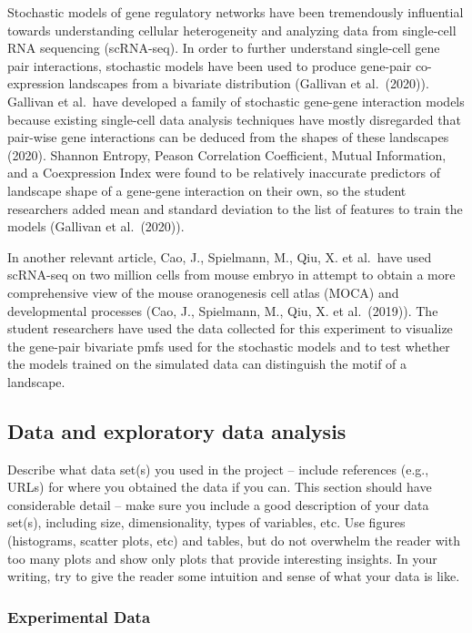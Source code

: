 \documentclass[
]{article}
\begin{document}
Stochastic models of gene regulatory networks have been tremendously
influential towards understanding cellular heterogeneity and analyzing
data from single-cell RNA sequencing (scRNA-seq). In order to further
understand single-cell gene pair interactions, stochastic models have
been used to produce gene-pair co-expression landscapes from a bivariate
distribution (Gallivan et al.~(2020)). Gallivan et al.~have developed a
family of stochastic gene-gene interaction models because existing
single-cell data analysis techniques have mostly disregarded that
pair-wise gene interactions can be deduced from the shapes of these
landscapes (2020). Shannon Entropy, Peason Correlation Coefficient,
Mutual Information, and a Coexpression Index were found to be relatively
inaccurate predictors of landscape shape of a gene-gene interaction on
their own, so the student researchers added mean and standard deviation
to the list of features to train the models (Gallivan et al.~(2020)).

In another relevant article, Cao, J., Spielmann, M., Qiu, X. et al.~have
used scRNA-seq on two million cells from mouse embryo in attempt to
obtain a more comprehensive view of the mouse oranogenesis cell atlas
(MOCA) and developmental processes (Cao, J., Spielmann, M., Qiu, X. et
al.~(2019)). The student researchers have used the data collected for
this experiment to visualize the gene-pair bivariate pmfs used for the
stochastic models and to test whether the models trained on the
simulated data can distinguish the motif of a landscape.

\hypertarget{data-and-exploratory-data-analysis}{%
\subsection{Data and exploratory data
analysis}\label{data-and-exploratory-data-analysis}}

Describe what data set(s) you used in the project -- include references
(e.g., URLs) for where you obtained the data if you can. This section
should have considerable detail -- make sure you include a good
description of your data set(s), including size, dimensionality, types
of variables, etc. Use figures (histograms, scatter plots, etc) and
tables, but do not overwhelm the reader with too many plots and show
only plots that provide interesting insights. In your writing, try to
give the reader some intuition and sense of what your data is like.

\hypertarget{experimental-data}{%
\subsubsection{Experimental Data}\label{experimental-data}}
\end{document}

